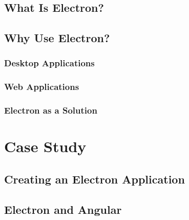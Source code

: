 \documentclass[11pt]{article}
\begin{document}
    \subsection{What Is Electron?}\label{subsec:what-is-electron}
    

    \subsection{Why Use Electron?}\label{subsec:why-use-electron}
    

    \subsubsection{Desktop Applications}\label{subsubsec:desktop-applications}
    

    \subsubsection{Web Applications}\label{subsubsec:web-applications}
    

    \subsubsection{Electron as a Solution}\label{subsubsec:electron-as-solution}
    
    \clearpage

    \section{Case Study}\label{sec:method}
    
    
    
    

    \subsection{Creating an Electron Application}\label{subsec:developing-with-electron-creation}
    

    \subsection{Electron and Angular}\label{subsec:developing-with-electron-angular}
    
\end{document}
